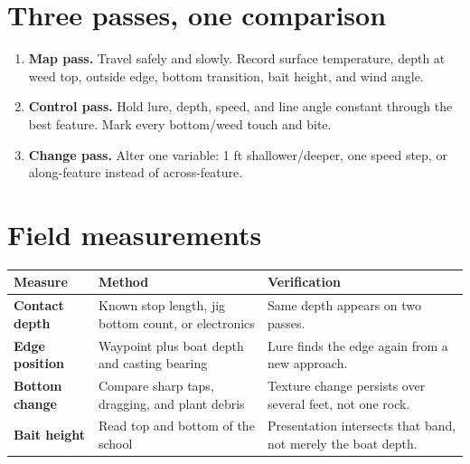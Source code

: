 \newpage
\section{Three passes, one comparison}
\begin{enumerate}
\item \textbf{Map pass.} Travel safely and slowly. Record surface temperature,
depth at weed top, outside edge, bottom transition, bait height, and wind angle.
\item \textbf{Control pass.} Hold lure, depth, speed, and line angle constant
through the best feature. Mark every bottom/weed touch and bite.
\item \textbf{Change pass.} Alter one variable: 1 ft shallower/deeper, one speed
step, or along-feature instead of across-feature.
\end{enumerate}
\begin{center}
\end{center}

\section{Field measurements}
\begin{tabularx}{\linewidth}{@{}>{\bfseries}p{.22\linewidth}p{.32\linewidth}X@{}}
\toprule Measure&Method&Verification\\\midrule
Contact depth&Known stop length, jig bottom count, or electronics&Same depth
appears on two passes.\\
Edge position&Waypoint plus boat depth and casting bearing&Lure finds the edge
again from a new approach.\\
Bottom change&Compare sharp taps, dragging, and plant debris&Texture change
persists over several feet, not one rock.\\
Bait height&Read top and bottom of the school&Presentation intersects that
band, not merely the boat depth.\\
\bottomrule
\end{tabularx}

